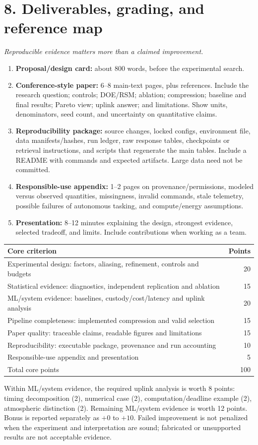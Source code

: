 \documentclass[11pt,letterpaper]{article}
\newcommand{\pageheading}[2]{\section*{\color{navy}#1}\textit{#2}\par}
\begin{document}
\newpage
\pageheading{8. Deliverables, grading, and reference map}{Reproducible evidence matters more than a claimed improvement.}
\begin{enumerate}
\item \textbf{Proposal/design card:} about 800 words, before the experimental search.
\item \textbf{Conference-style paper:} 6--8 main-text pages, plus references. Include the research question; controls; DOE/RSM; ablation; compression; baseline and final results; Pareto view; uplink answer; and limitations. Show units, denominators, seed count, and uncertainty on quantitative claims.
\item \textbf{Reproducibility package:} source changes, locked configs, environment file, data manifests/hashes, run ledger, raw response tables, checkpoints or retrieval instructions, and scripts that regenerate the main tables. Include a README with commands and expected artifacts. Large data need not be committed.
\item \textbf{Responsible-use appendix:} 1--2 pages on provenance/permissions, modeled versus observed quantities, missingness, invalid commands, stale telemetry, possible failures of autonomous tasking, and compute/energy assumptions.
\item \textbf{Presentation:} 8--12 minutes explaining the design, strongest evidence, selected tradeoff, and limits. Include contributions when working as a team.
\end{enumerate}
\begin{center}\small
\begin{tabularx}{\linewidth}{Xr}
\toprule
Core criterion & Points\\\midrule
Experimental design: factors, aliasing, refinement, controls and budgets & 20\\
Statistical evidence: diagnostics, independent replication and ablation & 15\\
ML/system evidence: baselines, custody/cost/latency and uplink analysis & 20\\
Pipeline completeness: implemented compression and valid selection & 15\\
Paper quality: traceable claims, readable figures and limitations & 15\\
Reproducibility: executable package, provenance and run accounting & 10\\
Responsible-use appendix and presentation & 5\\\midrule
Total core points & 100\\\bottomrule
\end{tabularx}
\end{center}
Within ML/system evidence, the required uplink analysis is worth 8 points: timing decomposition (2), numerical case (2), computation/deadline example (2), atmospheric distinction (2). Remaining ML/system evidence is worth 12 points. Bonus is reported separately as $+0$ to $+10$. Failed improvement is not penalized when the experiment and interpretation are sound; fabricated or unsupported results are not acceptable evidence.
\end{document}

